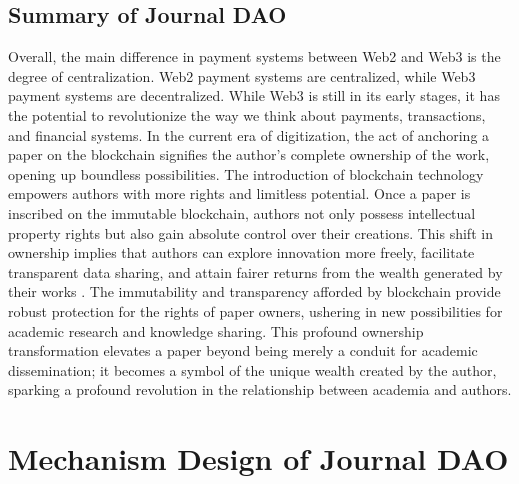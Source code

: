 \documentclass[lettersize,journal]{IEEEtran}
\begin{document}
\subsection{Summary of Journal DAO}




Overall, the main difference in payment systems between Web2 and Web3 is the degree of centralization. Web2 payment systems are centralized, while Web3 payment systems are decentralized. While Web3 is still in its early stages, it has the potential to revolutionize the way we think about payments, transactions, and financial systems.
In the current era of digitization, the act of anchoring a paper on the blockchain signifies the author's complete ownership of the work, opening up boundless possibilities. The introduction of blockchain technology empowers authors with more rights and limitless potential. Once a paper is inscribed on the immutable blockchain, authors not only possess intellectual property rights but also gain absolute control over their creations. This shift in ownership implies that authors can explore innovation more freely, facilitate transparent data sharing, and attain fairer returns from the wealth generated by their works \cite{wang2023decentralized}. The immutability and transparency afforded by blockchain provide robust protection for the rights of paper owners, ushering in new possibilities for academic research and knowledge sharing. This profound ownership transformation elevates a paper beyond being merely a conduit for academic dissemination; it becomes a symbol of the unique wealth created by the author, sparking a profound revolution in the relationship between academia and authors.




  
\section{Mechanism Design of Journal DAO \label{sec:mechanism}}
\end{document}
